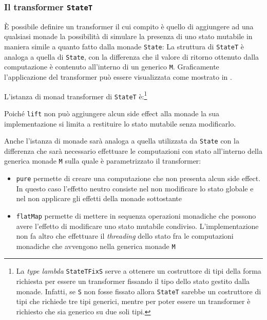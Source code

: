 \subsubsection{Il transformer \lstinline{StateT}}
È possibile definire un transformer il cui compito è quello di aggiungere ad una qualsiasi monade la possibilità di simulare la presenza di uno stato mutabile in maniera simile a quanto fatto dalla monade \lstinline{State}:
La struttura di \lstinline{StateT} è analoga a quella di \lstinline{State}, con la differenza che il valore di ritorno ottenuto dalla computazione è contenuto all'interno di un generico \lstinline{M}. Graficamente l'applicazione del transformer può essere visualizzata come mostrato in .



L'istanza di monad transformer di \lstinline{StateT} è:\footnote{La \emph{type lambda} \lstinline{StateTFixS} serve a ottenere un costruttore di tipi della forma richiesta per essere un transformer fissando il tipo dello stato gestito dalla monade. Infatti, se \lstinline{S} non fosse fissato allora \lstinline{StateT} sarebbe un costruttore di tipi che richiede tre tipi generici, mentre per poter essere un transformer è richiesto che sia generico su due soli tipi.}

Poiché \lstinline{lift} non può aggiungere alcun side effect alla monade la sua implementazione si limita a restituire lo stato mutabile senza modificarlo.

Anche l'istanza di monade sarà analoga a quella utilizzata da \lstinline{State} con la differenza che sarà necessario effettuare le computazioni con stato all'interno della generica monade \lstinline{M} sulla quale è parametrizzato il transformer:
\begin{itemize}
  \item \lstinline{pure} permette di creare una computazione che non presenta alcun side effect. In questo caso l'effetto neutro consiste nel non modificare lo stato globale e nel non applicare gli effetti della monade sottostante
  \item \lstinline{flatMap} permette di mettere in sequenza operazioni monadiche che possono avere l'effetto di modificare uno stato mutabile condiviso. L'implementazione non fa altro che effettuare il \emph{threading} dello stato fra le computazioni monadiche che avvengono nella generica monade \lstinline{M}
\end{itemize}

